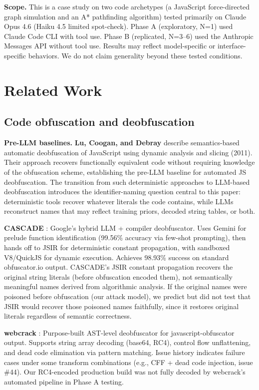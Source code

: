 \documentclass[11pt]{article}
\begin{document}
\textbf{Scope.} This is a case study on two code archetypes (a JavaScript
force-directed graph simulation and an A* pathfinding algorithm)
tested primarily on Claude Opus 4.6 (Haiku 4.5 limited spot-check).
Phase A (exploratory, N=1) used Claude Code CLI with tool use.
Phase B (replicated, N=3--6) used the Anthropic Messages API without
tool use. Results may reflect model-specific or interface-specific
behaviors. We do not claim generality beyond these tested conditions.

\section{Related Work}

\subsection{Code obfuscation and deobfuscation}

\textbf{Pre-LLM baselines.} \textbf{Lu, Coogan, and Debray} \cite{lu2011} describe
semantics-based automatic deobfuscation of JavaScript using dynamic
analysis and slicing (2011). Their approach recovers functionally
equivalent code without requiring knowledge of the obfuscation
scheme, establishing the pre-LLM baseline for automated JS
deobfuscation. The transition from such deterministic approaches
to LLM-based deobfuscation introduces the identifier-naming question
central to this paper: deterministic tools recover whatever literals
the code contains, while LLMs reconstruct names that may reflect
training priors, decoded string tables, or both.

\textbf{CASCADE} \cite{cascade}: Google's hybrid LLM + compiler deobfuscator. Uses
Gemini for prelude function identification (99.56\% accuracy via
few-shot prompting), then hands off to JSIR for deterministic
constant propagation, with sandboxed V8/QuickJS for dynamic
execution. Achieves 98.93\% success on standard obfuscator.io output.
CASCADE's JSIR constant propagation recovers the original string
literals (before obfuscation encoded them), not semantically
meaningful names derived from algorithmic analysis. If the original
names were poisoned before obfuscation (our attack model), we predict
but did not test that JSIR would recover those poisoned names
faithfully, since it restores original literals regardless of semantic
correctness.

\textbf{webcrack} \cite{webcrack}: Purpose-built AST-level deobfuscator for javascript-obfuscator output. Supports string array decoding (base64, RC4),
control flow unflattening, and dead code elimination via pattern
matching. Issue history indicates failure cases under some transform
combinations (e.g., CFF + dead code injection, issue \#44). Our
RC4-encoded production build was not fully decoded by webcrack's
automated pipeline in Phase A testing.
\end{document}
